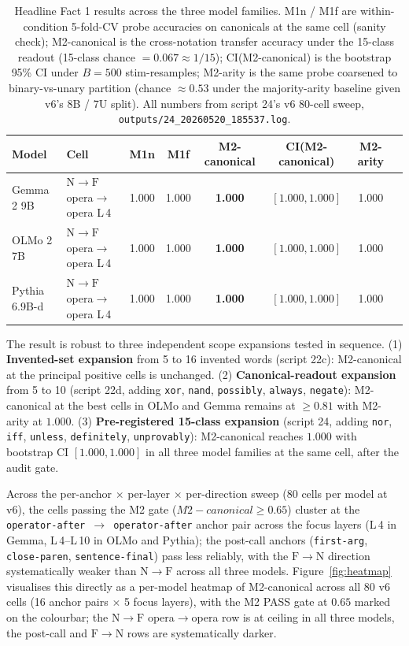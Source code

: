 \documentclass[11pt,letterpaper]{article}
\newcommand{\NtoF}{\ensuremath{\mathrm{N}\!\to\!\mathrm{F}}}
\newcommand{\FtoN}{\ensuremath{\mathrm{F}\!\to\!\mathrm{N}}}
\newcommand{\Mc}{M2-canonical}
\newcommand{\Ma}{M2-arity}
\begin{document}
\begin{table}[h]
  \centering
  \small
  \begin{tabular}{llcccccc}
    \toprule
    Model & Cell & M1n & M1f & \Mc{} & CI(\Mc) & \Ma{}\\
    \midrule
    Gemma 2 9B    & \NtoF{} opera$\to$opera L\,4 & 1.000 & 1.000 & \textbf{1.000} & $[1.000, 1.000]$ & 1.000\\
    OLMo 2 7B     & \NtoF{} opera$\to$opera L\,4 & 1.000 & 1.000 & \textbf{1.000} & $[1.000, 1.000]$ & 1.000\\
    Pythia 6.9B-d & \NtoF{} opera$\to$opera L\,4 & 1.000 & 1.000 & \textbf{1.000} & $[1.000, 1.000]$ & 1.000\\
    \bottomrule
  \end{tabular}
  \caption{Headline Fact 1 results across the three model families.
  M1n / M1f are within-condition 5-fold-CV probe accuracies on
  canonicals at the same cell (sanity check); \Mc{} is the
  cross-notation transfer accuracy under the 15-class readout
  (15-class chance $= 0.067 \approx 1/15$); CI(\Mc) is the bootstrap
  95\% CI under $B=500$ stim-resamples; \Ma{} is the same probe
  coarsened to binary-vs-unary partition (chance $\approx 0.53$ under
  the majority-arity baseline given v6's 8B / 7U split). All numbers
  from script 24's v6 80-cell sweep,
  \texttt{outputs/24\_20260520\_185537.log}.}
  \label{tab:fact1}
\end{table}

The result is robust to three independent scope expansions tested in
sequence. (1) \textbf{Invented-set expansion} from 5 to 16 invented
words (script 22c): \Mc{} at the principal positive cells is unchanged.
(2) \textbf{Canonical-readout expansion} from 5 to 10 (script 22d,
adding \texttt{xor}, \texttt{nand}, \texttt{possibly},
\texttt{always}, \texttt{negate}): \Mc{} at the best cells in OLMo and
Gemma remains at $\geq 0.81$ with \Ma{} at $1.000$.
(3) \textbf{Pre-registered 15-class expansion} (script 24, adding
\texttt{nor}, \texttt{iff}, \texttt{unless}, \texttt{definitely},
\texttt{unprovably}): \Mc{} reaches $1.000$ with bootstrap CI
$[1.000, 1.000]$ in all three model families at the same cell, after
the audit gate.

Across the per-anchor $\times$ per-layer $\times$ per-direction sweep
(80 cells per model at v6), the cells passing the M2 gate
($\Mc \geq 0.65$) cluster at the
\texttt{operator-after $\to$ operator-after} anchor pair across the
focus layers (L\,4 in Gemma, L\,4--L\,10 in OLMo and Pythia); the
post-call anchors (\texttt{first-arg}, \texttt{close-paren},
\texttt{sentence-final}) pass less reliably, with the \FtoN{}
direction systematically weaker than \NtoF{} across all three models.
Figure~\ref{fig:heatmap} visualises this directly as a per-model
heatmap of \Mc{} across all 80 v6 cells (16 anchor pairs $\times$ 5
focus layers), with the M2 PASS gate at $0.65$ marked on the
colourbar; the \NtoF{} opera$\to$opera row is at ceiling in all three
models, the post-call and \FtoN{} rows are systematically darker.
\end{document}
